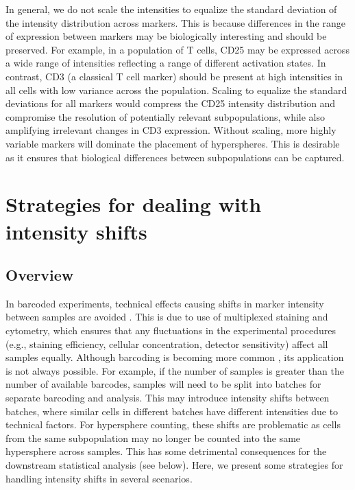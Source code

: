 \documentclass{article}
\begin{document}
In general, we do not scale the intensities to equalize the standard deviation of the intensity distribution across markers.
This is because differences in the range of expression between markers may be biologically interesting and should be preserved.
For example, in a population of T cells, CD25 may be expressed across a wide range of intensities reflecting a range of different activation states.
In contrast, CD3 (a classical T cell marker) should be present at high intensities in all cells with low variance across the population.
Scaling to equalize the standard deviations for all markers would compress the CD25 intensity distribution and compromise the resolution of potentially relevant subpopulations, while also amplifying irrelevant changes in CD3 expression.
Without scaling, more highly variable markers will dominate the placement of hyperspheres.
This is desirable as it ensures that biological differences between subpopulations can be captured. 

\section{Strategies for dealing with intensity shifts}

\subsection{Overview}
In barcoded experiments, technical effects causing shifts in marker intensity between samples are avoided \cite{zunder2015palladium}.
This is due to use of multiplexed staining and cytometry, which ensures that any fluctuations in the experimental procedures (e.g., staining efficiency, cellular concentration, detector sensitivity) affect all samples equally.
Although barcoding is becoming more common \cite{gaudilliere2014delayed,gaudilliere2015implementing}, its application is not always possible.
For example, if the number of samples is greater than the number of available barcodes, samples will need to be split into batches for separate barcoding and analysis.
This may introduce intensity shifts between batches, where similar cells in different batches have different intensities due to technical factors.
For hypersphere counting, these shifts are problematic as cells from the same subpopulation may no longer be counted into the same hypersphere across samples.
This has some detrimental consequences for the downstream statistical analysis (see below).
Here, we present some strategies for handling intensity shifts in several scenarios.
\end{document}
